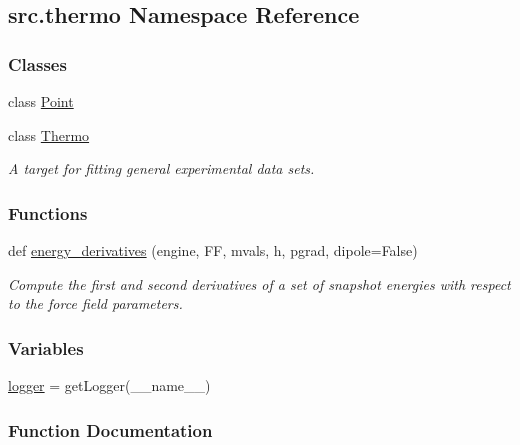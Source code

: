 \hypertarget{namespacesrc_1_1thermo}{}\subsection{src.\+thermo Namespace Reference}
\label{namespacesrc_1_1thermo}
\subsubsection*{Classes}
\begin{DoxyCompactItemize}
\item 
class \hyperlink{classsrc_1_1thermo_1_1Point}{Point}
\item 
class \hyperlink{classsrc_1_1thermo_1_1Thermo}{Thermo}
\begin{DoxyCompactList}\small\item\em A target for fitting general experimental data sets. \end{DoxyCompactList}\end{DoxyCompactItemize}
\subsubsection*{Functions}
\begin{DoxyCompactItemize}
\item 
def \hyperlink{namespacesrc_1_1thermo_a3aaa182f02560e7270d90bd0030ab8e6}{energy\+\_\+derivatives} (engine, FF, mvals, h, pgrad, dipole=False)
\begin{DoxyCompactList}\small\item\em Compute the first and second derivatives of a set of snapshot energies with respect to the force field parameters. \end{DoxyCompactList}\end{DoxyCompactItemize}
\subsubsection*{Variables}
\begin{DoxyCompactItemize}
\item 
\hyperlink{namespacesrc_1_1thermo_a3bb9aec3ed44b9a4a826e9c93a2a312c}{logger} = get\+Logger(\+\_\+\+\_\+name\+\_\+\+\_\+)
\end{DoxyCompactItemize}


\subsubsection{Function Documentation}
\mbox{\label{namespacesrc_1_1thermo_a3aaa182f02560e7270d90bd0030ab8e6}} 
